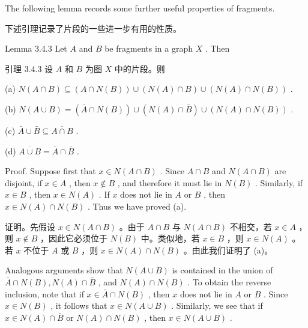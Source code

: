 \documentclass[10pt]{article}
\begin{document}
The following lemma records some further useful properties of fragments.

\begin{tcolorbox}\relax
下述引理记录了片段的一些进一步有用的性质。
\end{tcolorbox}

Lemma 3.4.3 Let \(A\) and \(B\) be fragments in a graph \(X\) . Then

\begin{tcolorbox}\relax
引理 3.4.3 设 \(A\) 和 \(B\) 为图 \(X\) 中的片段。则
\end{tcolorbox}

(a) \(N\left( {A \cap  B}\right)  \subseteq  \left( {A \cap  N\left( B\right) }\right)  \cup  \left( {N\left( A\right)  \cap  B}\right)  \cup  \left( {N\left( A\right)  \cap  N\left( B\right) }\right)\) .

(b) \(N\left( {A \cup  B}\right)  = \left( {\bar{A} \cap  N\left( B\right) }\right)  \cup  \left( {N\left( A\right)  \cap  \bar{B}}\right)  \cup  \left( {N\left( A\right)  \cap  N\left( B\right) }\right)\) .

(c) \(\bar{A} \cup  \bar{B} \subseteq  \overline{A \cap  B}\) .

(d) \(\overline{A \cup  B} = \bar{A} \cap  \bar{B}\) .

Proof. Suppose first that \(x \in  N\left( {A \cap  B}\right)\) . Since \(A \cap  B\) and \(N\left( {A \cap  B}\right)\) are disjoint, if \(x \in  A\) , then \(x \notin  B\) , and therefore it must lie in \(N\left( B\right)\) . Similarly, if \(x \in  B\) , then \(x \in  N\left( A\right)\) . If \(x\) does not lie in \(A\) or \(B\) , then \(x \in  N\left( A\right)  \cap  N\left( B\right)\) . Thus we have proved (a).

\begin{tcolorbox}\relax
证明。先假设 \(x \in  N\left( {A \cap  B}\right)\) 。由于 \(A \cap  B\) 与 \(N\left( {A \cap  B}\right)\) 不相交，若 \(x \in  A\) ，则 \(x \notin  B\) ，因此它必须位于 \(N\left( B\right)\) 中。类似地，若 \(x \in  B\) ，则 \(x \in  N\left( A\right)\) 。若 \(x\) 不位于 \(A\) 或 \(B\) ，则 \(x \in  N\left( A\right)  \cap  N\left( B\right)\) 。由此我们证明了 (a)。
\end{tcolorbox}

Analogous arguments show that \(N\left( {A \cup  B}\right)\) is contained in the union of \(\bar{A} \cap  N\left( B\right) ,N\left( A\right)  \cap  \bar{B}\) , and \(N\left( A\right)  \cap  N\left( B\right)\) . To obtain the reverse inclusion, note that if \(x \in  \bar{A} \cap  N\left( B\right)\) , then \(x\) does not lie in \(A\) or \(B\) . Since \(x \in  N\left( B\right)\) , it follows that \(x \in  N\left( {A \cup  B}\right)\) . Similarly, we see that if \(x \in  N\left( A\right)  \cap  \bar{B}\) or \(N\left( A\right)  \cap  N\left( B\right)\) , then \(x \in  N\left( {A \cup  B}\right)\) .
\end{document}
